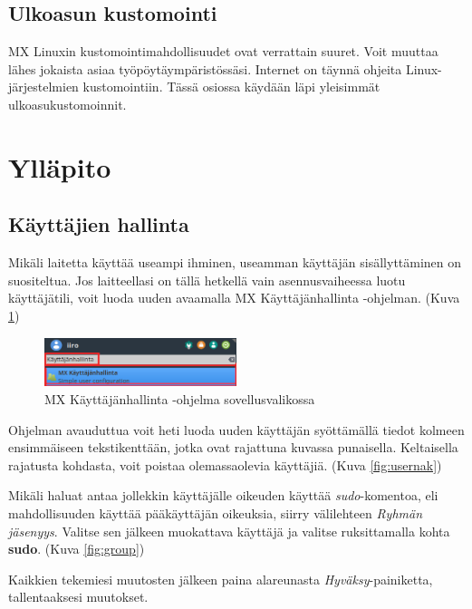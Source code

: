 \documentclass[a4paper, 12pt, finnish]{article}
\begin{document}
\subsection{Ulkoasun kustomointi}

MX Linuxin kustomointimahdollisuudet ovat verrattain suuret. Voit muuttaa lähes jokaista asiaa työpöytäympäristössäsi. Internet on täynnä ohjeita Linux-järjestelmien kustomointiin. Tässä osiossa käydään läpi yleisimmät ulkoasukustomoinnit.

\section{Ylläpito}
\subsection{Käyttäjien hallinta}
Mikäli laitetta käyttää useampi ihminen, useamman käyttäjän sisällyttäminen on suositeltua. Jos laitteellasi on tällä hetkellä vain asennusvaiheessa luotu käyttäjätili, voit luoda uuden avaamalla MX Käyttäjänhallinta -ohjelman. (Kuva \ref{fig:hallinta})

\begin{figure}[htpb]
    \begin{center}
        \includegraphics[width=0.5\textwidth]{user/set}
        \caption{MX Käyttäjänhallinta -ohjelma sovellusvalikossa}
        \label{fig:hallinta}
    \end{center}
\end{figure}

Ohjelman avauduttua voit heti luoda uuden käyttäjän syöttämällä tiedot kolmeen ensimmäiseen tekstikenttään, jotka ovat rajattuna kuvassa punaisella. Keltaisella rajatusta kohdasta, voit poistaa olemassaolevia käyttäjiä. (Kuva \ref{fig:usernak})

Mikäli haluat antaa jollekkin käyttäjälle oikeuden käyttää \textit{sudo}-komentoa, eli mahdollisuuden käyttää pääkäyttäjän oikeuksia, siirry välilehteen \textit{Ryhmän jäsenyys}. Valitse sen jälkeen muokattava käyttäjä ja valitse ruksittamalla kohta \textbf{sudo}. (Kuva \ref{fig:group})

Kaikkien tekemiesi muutosten jälkeen paina alareunasta \textit{Hyväksy}-painiketta, tallentaaksesi muutokset.
\end{document}
